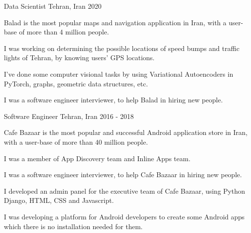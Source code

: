 

\begin{cventries}

 \cventry
    {Data Scientist} %
    {} %
    {Tehran, Iran} %
    {2020} %
    {
      \begin{cvitems} %
        \item {Balad is the most popular maps and navigation application in Iran, with a user-base of more than 4 million people.}
        \item {I was working on determining the possible locations of speed bumps and traffic lights of Tehran, by knowing users' GPS locations.}
        \item {I've done some computer visional tasks by using Variational Autoencoders in PyTorch, graphs, geometric data structures, etc.}
        \item {I was a software engineer interviewer, to help Balad in hiring new people.}
      \end{cvitems}
    }

  \cventry
    {Software Engineer} %
    {} %
    {Tehran, Iran} %
    {2016 - 2018} %
    {
      \begin{cvitems} %
        \item {Cafe Bazaar is the most popular and successful Android application store in Iran, with a user-base of more than 40 million people.}
        \item {I was a member of App Discovery team and Inline Apps team.}
        \item {I was a software engineer interviewer, to help Cafe Bazaar in hiring new people.}
        \item {I developed an admin panel for the executive team of Cafe Bazaar, using Python Django, HTML, CSS and Javascript.}
        \item {I was developing a platform for Android developers to create some Android apps which there is no installation needed for them.}
      \end{cvitems}
    }


\end{cventries}
